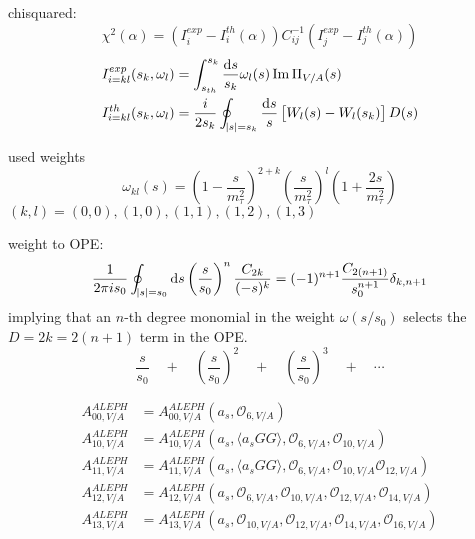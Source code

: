 \documentclass{article}
\begin{document}
  chisquared:
  \begin{equation}
    \chi^2(\alpha) = (I_i^{exp}-I_i^{th}(\alpha)) C_{ij}^{-1} (I_j^{exp}-I_j^{th}(\alpha))
  \end{equation}
  \begin{equation}
    \begin{split}
      I_{i=kl}^{exp}(s_k,\omega_l) &= \int_{s_{th}}^{s_k} \frac{\dif s}{s_k} \omega_l (s) \operatorname{Im} \Pi_{V/A}(s) \\
      I_{i=kl}^{th}(s_k,\omega_l) &= \frac{i}{2 s_k} \oint_{\envert{s}=s_k} \frac{\dif s}{s} \left[ W_l(s) - W_l(s_k) \right] D(s)
    \end{split}
  \end{equation} 
  
  used weights
  \begin{equation}
    \omega_{kl}(s) = \left( 1 - \frac{s}{m_\tau^2} \right)^{2+k} \left( \frac{s}{m_\tau^2} \right)^l \left( 1 + \frac{2s}{m_\tau^2} \right)
  \end{equation}
  $(k,l) = {(0,0), (1,0), (1,1), (1,2), (1,3)}$

  weight to OPE:
  \begin{equation}
    \frac{1}{2 \pi i s_0} \oint_{\envert{s}=s_0} \dif s \left( \frac{s}{s_0} \right)^n \frac{C_{2k}}{(-s)^k} = (-1)^{n+1} \frac{C_{2(n+1)}}{s_0^{n+1}} \delta_{k,n+1}
  \end{equation}
  implying that an $n$-th degree monomial in the weight $\omega(s/s_0)$ selects
  the $D=2k=2(n+1)$ term in the OPE.
  \begin{equation}
    \frac{s}{s_0} \quad + \quad \left( \frac{s}{s_0} \right)^2 \quad + \quad \left( \frac{s}{s_0} \right)^3 \quad + \quad \cdots
  \end{equation}
  
  \begin{equation}
    \begin{split}
      A_{00,V/A}^{ALEPH} &= A_{00,V/A}^{ALEPH}(a_s, \mathcal{O}_{6,V/A}) \\
      A_{10,V/A}^{ALEPH} &= A_{10,V/A}^{ALEPH}(a_s,\langle a_s GG \rangle, \mathcal{O}_{6,V/A}, \mathcal{O}_{10,V/A}) \\
      A_{11,V/A}^{ALEPH} &= A_{11,V/A}^{ALEPH}(a_s,\langle a_s GG \rangle, \mathcal{O}_{6,V/A}, \mathcal{O}_{10,V/A} \mathcal{O}_{12,V/A}) \\
      A_{12,V/A}^{ALEPH} &= A_{12,V/A}^{ALEPH}(a_s, \mathcal{O}_{6,V/A}, \mathcal{O}_{10,V/A}, \mathcal{O}_{12,V/A}, \mathcal{O}_{14,V/A}) \\
      A_{13,V/A}^{ALEPH} &= A_{13,V/A}^{ALEPH}(a_s, \mathcal{O}_{10,V/A}, \mathcal{O}_{12,V/A}, \mathcal{O}_{14,V/A}, \mathcal{O}_{16,V/A})
    \end{split} 
  \end{equation}
\end{document}
